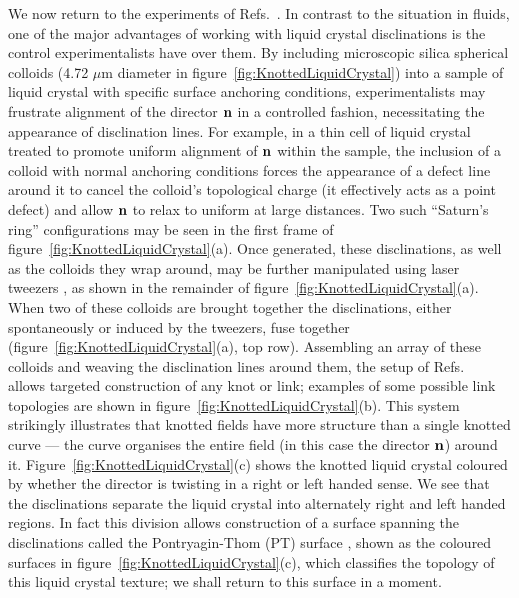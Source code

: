 We now return to the experiments of Refs.~\citep{Tkalec2011,Tasinkevych2014,Copar2015}. In contrast to the situation in fluids, one of the major advantages of working with liquid crystal disclinations is the control experimentalists have over them. By including microscopic silica spherical colloids (4.72 $\mu$m diameter in figure~\ref{fig:KnottedLiquidCrystal}) into a sample of liquid crystal with specific surface anchoring conditions, experimentalists may frustrate alignment of the director $\bf n$ in a controlled fashion, necessitating the appearance of disclination lines. For example, in a thin cell of liquid crystal treated to promote uniform alignment of $\bf n$ within the sample, the inclusion of a colloid with normal anchoring conditions forces the appearance of a defect line around it to cancel the colloid's topological charge (it effectively acts as a point defect) and allow $\bf n$ to relax to uniform at large distances. Two such ``Saturn's ring'' configurations may be seen in the first frame of figure~\ref{fig:KnottedLiquidCrystal}(a). Once generated, these disclinations, as well as the colloids they wrap around, may be further manipulated using laser tweezers \citep{Tkalec2011}, as shown in the remainder of figure~\ref{fig:KnottedLiquidCrystal}(a). When two of these colloids are brought together the disclinations, either spontaneously or induced by the tweezers, fuse together (figure~\ref{fig:KnottedLiquidCrystal}(a), top row). Assembling an array of these colloids and weaving the disclination lines around them, the setup of Refs.~\citep{Tkalec2011,Tasinkevych2014,Copar2015} allows targeted construction of any knot or link; examples of some possible link topologies are shown in figure~\ref{fig:KnottedLiquidCrystal}(b). This system strikingly illustrates that knotted fields have more structure than a single knotted curve --- the curve organises the entire field (in this case the director $\bf n$) around it. Figure~\ref{fig:KnottedLiquidCrystal}(c) shows the knotted liquid crystal coloured by whether the director is twisting in a right or left handed sense. We see that the disclinations separate the liquid crystal into alternately right and left handed regions. In fact this division allows construction of a surface spanning the disclinations called the Pontryagin-Thom (PT) surface \citep{ChenThesis,Chen2013}, shown as the coloured surfaces in figure~\ref{fig:KnottedLiquidCrystal}(c), which classifies the topology of this liquid crystal texture; we shall return to this surface in a moment.

